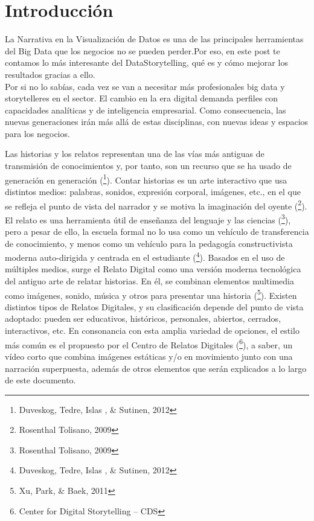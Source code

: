 \documentclass[a4paper,12pt,twocolumn]{article}
\begin{document}
\section{Introducción}
\item{La Narrativa en la Visualización de Datos es una de las principales herramientas del Big Data que los negocios no se pueden perder.Por eso, en este post te contamos lo más interesante del DataStorytelling, qué es y cómo mejorar los resultados gracias a ello.\\
Por si no lo sabías, cada vez se van a necesitar más profesionales big data y  storytelleres en el sector. El cambio en la era digital demanda perfiles con capacidades analíticas y de inteligencia empresarial. Como consecuencia, las nuevas generaciones irán más allá de estas disciplinas, con nuevas ideas y espacios para los negocios.

Las historias y los relatos representan una de las vías más antiguas de transmisión de conocimientos y, por tanto, son un recurso que se ha usado de generación en generación (\footnote{Duveskog, Tedre, Islas , \& Sutinen, 2012}). Contar historias es un arte interactivo que usa distintos medios: palabras, sonidos, expresión corporal, imágenes, etc., en el que se refleja el punto de vista del narrador y se motiva la imaginación del oyente (\footnote{Rosenthal Tolisano, 2009}).
El relato es una herramienta útil de enseñanza del lenguaje y las ciencias (\footnote{Rosenthal Tolisano, 2009}), pero a pesar de ello, la escuela formal no lo usa como un vehículo de transferencia de conocimiento, y menos como un vehículo para la pedagogía constructivista moderna auto-dirigida y centrada en el estudiante (\footnote{Duveskog, Tedre, Islas , \& Sutinen, 2012}).
Basados en el uso de múltiples medios, surge el Relato Digital como una versión moderna tecnológica del antiguo arte de relatar historias. En él, se combinan elementos multimedia como imágenes, sonido, música y otros para presentar una historia (\footnote{Xu, Park, \& Baek, 2011}).
Existen distintos tipos de Relatos Digitales, y su clasificación depende del punto de vista adoptado: pueden ser educativos, históricos, personales, abiertos, cerrados, interactivos, etc. En consonancia con esta amplia variedad de opciones, el estilo más común es el propuesto por el Centro de Relatos Digitales (\footnote{Center for Digital Storytelling – CDS}), a saber, un vídeo corto que combina imágenes estáticas y/o en movimiento junto con una narración superpuesta, además de otros elementos que serán explicados a lo largo de este documento.}
\end{document}
